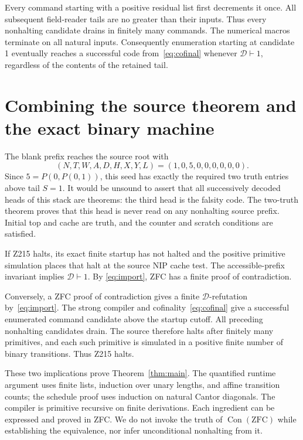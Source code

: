 \documentclass[11pt,letterpaper]{article}
\theoremstyle{definition}
\newcommand{\ZFC}{\mathrm{ZFC}}
\newcommand{\Con}{\operatorname{Con}}
\newcommand{\CalD}{\mathcal D}
\begin{document}
Every command starting with a positive residual list first decrements
it once.  All subsequent field-reader tails are no greater than their
inputs.  Thus every nonhalting candidate drains in finitely many
commands.  The numerical macros terminate on all natural inputs.
Consequently enumeration starting at candidate 1 eventually reaches a
successful code from~\eqref{eq:cofinal} whenever $\CalD\vdash1$,
regardless of the contents of the retained tail.



\section{Combining the source theorem and the exact binary machine}
\label{sec:combine}

The blank prefix reaches the source root with
\[
 (N,T,W,A,D,H,X,Y,L)=(1,0,5,0,0,0,0,0,0).
\]
Since $5=P(0,P(0,1))$, this seed has exactly the required two truth
entries above tail $S=1$.  It would be unsound to assert that all
successively decoded heads of this stack are theorems: the third head
is the falsity code.  The two-truth theorem proves that this head is
never read on any nonhalting source prefix.  Initial top and cache
are truth, and the counter and scratch conditions are satisfied.

If Z215 halts, its exact finite startup has not halted and the positive
primitive simulation places that halt at the source NIP cache test.
The accessible-prefix invariant implies $\CalD\vdash1$.  By
\eqref{eq:import}, ZFC has a finite proof of contradiction.

Conversely, a ZFC proof of contradiction gives a finite
$\CalD$-refutation by~\eqref{eq:import}.  The strong compiler and
cofinality~\eqref{eq:cofinal} give a successful enumerated command
candidate above the startup cutoff.  All preceding nonhalting
candidates drain.  The source therefore halts after finitely many
primitives, and each such primitive is simulated in a positive finite
number of binary transitions.  Thus Z215 halts.

These two implications prove Theorem~\ref{thm:main}.  The quantified
runtime argument uses finite lists, induction over unary lengths, and
affine transition counts; the schedule proof uses induction on natural
Cantor diagonals.  The compiler is primitive recursive on finite
derivations.  Each ingredient can be expressed and proved in ZFC.
We do not invoke the truth of $\Con(\ZFC)$ while establishing the
equivalence, nor infer unconditional nonhalting from it.
\end{document}
